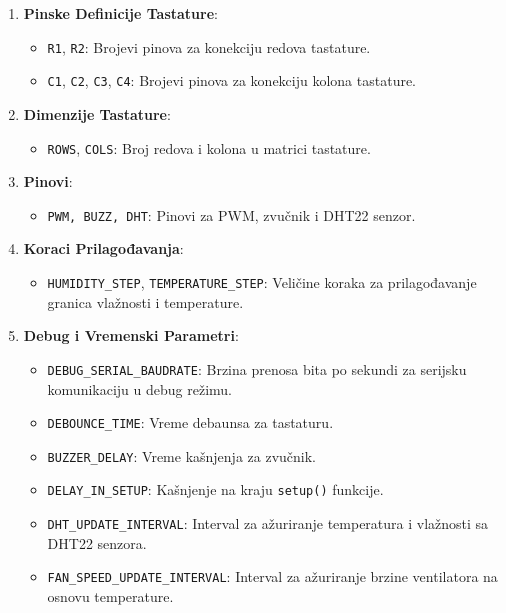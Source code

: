 \documentclass[a4paper, 12pt]{article}
\begin{document}
\begin{enumerate}

	\item \textbf{Pinske Definicije Tastature}:

	\begin{itemize}
    		\item \texttt{R1}, \texttt{R2}: Brojevi pinova za konekciju redova tastature.
    		\item \texttt{C1}, \texttt{C2}, \texttt{C3}, \texttt{C4}: Brojevi pinova za konekciju kolona tastature.
	\end{itemize}

	\item \textbf{Dimenzije Tastature}:
	\begin{itemize}
    		\item \texttt{ROWS}, \texttt{COLS}: Broj redova i kolona u matrici tastature.
	\end{itemize}

	\item \textbf{Pinovi}:
	\begin{itemize}
    		\item \texttt{PWM, BUZZ, DHT}: Pinovi za PWM, zvučnik i DHT22 senzor.
	\end{itemize}

	\item \textbf{Koraci Prilagođavanja}:
	\begin{itemize}
    		\item \texttt{HUMIDITY\_STEP}, \texttt{TEMPERATURE\_STEP}: Veličine koraka za prilagođavanje granica vlažnosti i temperature.
	\end{itemize}

	\item \textbf{Debug i Vremenski Parametri}:
	\begin{itemize}
		\item \texttt{DEBUG\_SERIAL\_BAUDRATE}: Brzina prenosa bita po sekundi za serijsku komunikaciju u debug režimu.
		\item \texttt{DEBOUNCE\_TIME}: Vreme debaunsa za tastaturu.
		\item \texttt{BUZZER\_DELAY}: Vreme kašnjenja za zvučnik.
		\item \texttt{DELAY\_IN\_SETUP}: Kašnjenje na kraju \texttt{setup()} funkcije.
		\item \texttt{DHT\_UPDATE\_INTERVAL}: Interval za ažuriranje temperatura i vlažnosti sa DHT22 senzora.
		\item \texttt{FAN\_SPEED\_UPDATE\_INTERVAL}: Interval za ažuriranje brzine ventilatora na osnovu temperature.
	\end{itemize}
	

\end{enumerate}
\end{document}
